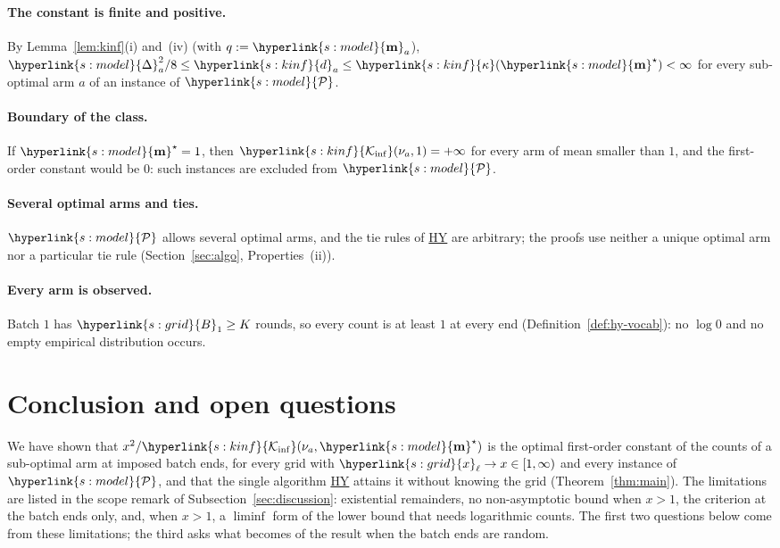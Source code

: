 \documentclass[10pt]{article}
\newcommand{\sy}[2]{{\hyperlink{#1}{#2}}}
\newcommand{\1}{\mathbf{1}}
\newcommand{\m}{\sy{s:model}{\mathbf{m}}}
\newcommand{\cP}{\sy{s:model}{\mathcal P}}
\newcommand{\Dg}{\sy{s:model}{\Delta}}
\newcommand{\Ki}{\sy{s:kinf}{\mathcal K_{\inf}}}
\newcommand{\kap}{\sy{s:kinf}{\kappa}}
\newcommand{\da}{\sy{s:kinf}{d}_a}
\newcommand{\xg}{\sy{s:grid}{x}}
\newcommand{\Bg}{\sy{s:grid}{B}}
\newcommand{\HY}{\hyperref[def:hy]{\textup{HY}}}
\begin{document}
\paragraph{The constant is finite and positive.} By Lemma~\ref{lem:kinf}(i) and~(iv) (with $q:=\m_a$), $\Dg_a^2/8\le\da\le\kap(\m^\star)<\infty$ for every sub-optimal arm
$a$ of an instance of $\cP$.

\paragraph{Boundary of the class.} If $\m^\star=1$, then $\Ki(\nu_a,1)=+\infty$ for every arm of mean smaller than $1$, and the first-order constant would be $0$: such
instances are excluded from $\cP$.

\paragraph{Several optimal arms and ties.} $\cP$ allows several optimal arms, and the tie rules of \HY{} are arbitrary; the proofs use neither a unique optimal arm nor a
particular tie rule (Section~\ref{sec:algo}, Properties~(ii)).

\paragraph{Every arm is observed.} Batch $1$ has $\Bg_1\ge K$ rounds, so every count is at least $1$ at every end (Definition~\ref{def:hy-vocab}): no $\log0$ and no empty
empirical distribution occurs.

\section{Conclusion and open questions}\label{sec:open}

We have shown that $x^2/\Ki(\nu_a,\m^\star)$ is the optimal first-order constant of the counts of a sub-optimal arm at imposed batch ends, for
every grid with $\xg_\ell\to x\in[1,\infty)$ and every instance of $\cP$, and that the single algorithm \HY{} attains it without knowing the grid
(Theorem~\ref{thm:main}). The limitations are listed in the scope remark of Subsection~\ref{sec:discussion}: existential remainders, no
non-asymptotic bound when $x>1$, the criterion at the batch ends only, and, when $x>1$, a $\liminf$ form of the lower bound that needs
logarithmic counts. The first two questions below come from these limitations; the third asks what becomes of the result when the batch
ends are random.
\end{document}
